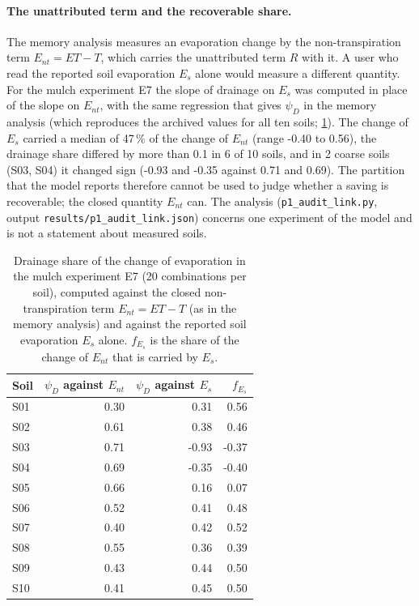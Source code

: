 \paragraph{The unattributed term and the recoverable share.}\label{sec:auditlink}
The memory analysis measures an evaporation change by the non-transpiration term $E_{nt}=\mathit{ET}-T$, which carries the unattributed term $R$ with it. A user who read the reported soil evaporation $E_s$ alone would measure a different quantity. For the mulch experiment E7 the slope of drainage on $E_s$ was computed in place of the slope on $E_{nt}$, with the same regression that gives $\psi_D$ in the memory analysis (which reproduces the archived values for all ten soils; \cref{tab:auditlink}). The change of $E_s$ carried a median of 47\,\% of the change of $E_{nt}$ (range -0.40 to 0.56), the drainage share differed by more than 0.1 in 6 of 10 soils, and in 2 coarse soils (S03, S04) it changed sign (-0.93 and -0.35 against 0.71 and 0.69). The partition that the model reports therefore cannot be used to judge whether a saving is recoverable; the closed quantity $E_{nt}$ can. The analysis (\texttt{p1\_audit\_link.py}, output \texttt{results/p1\_audit\_link.json}) concerns one experiment of the model and is not a statement about measured soils.
\begin{table}[H]\centering\small
\caption{Drainage share of the change of evaporation in the mulch experiment E7 (20 combinations per soil), computed against the closed non-transpiration term $E_{nt}=\mathit{ET}-T$ (as in the memory analysis) and against the reported soil evaporation $E_s$ alone. $f_{E_s}$ is the share of the change of $E_{nt}$ that is carried by $E_s$.}\label{tab:auditlink}
\begin{tabular}{lrrr}\toprule
Soil & $\psi_D$ against $E_{nt}$ & $\psi_D$ against $E_s$ & $f_{E_s}$\\\midrule
S01 & 0.30 & 0.31 & 0.56\\
S02 & 0.61 & 0.38 & 0.46\\
S03 & 0.71 & -0.93 & -0.37\\
S04 & 0.69 & -0.35 & -0.40\\
S05 & 0.66 & 0.16 & 0.07\\
S06 & 0.52 & 0.41 & 0.48\\
S07 & 0.40 & 0.42 & 0.52\\
S08 & 0.55 & 0.36 & 0.39\\
S09 & 0.43 & 0.44 & 0.50\\
S10 & 0.41 & 0.45 & 0.50\\
\bottomrule\end{tabular}\end{table}

